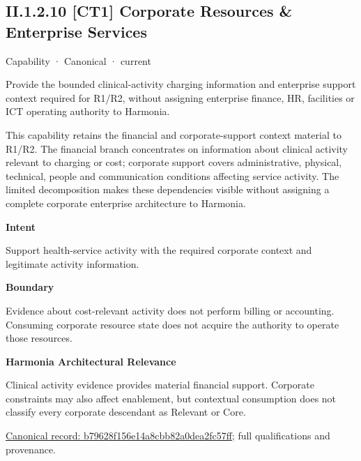 \subsection*{II.1.2.10 [CT1] Corporate Resources \& Enterprise Services}
\label{navigation:II.1.2.10}

\label{element:b79628f156e14a8cbb82a0dea2fc57ff}
{\small Capability · Canonical · current}\par

Provide the bounded clinical-activity charging information and enterprise support context required for R1/R2, without assigning enterprise finance, HR, facilities or ICT operating authority to Harmonia.



This capability retains the financial and corporate-support context material to R1/R2. The financial branch concentrates on information about clinical activity relevant to charging or cost; corporate support covers administrative, physical, technical, people and communication conditions affecting service activity. The limited decomposition makes these dependencies visible without assigning a complete corporate enterprise architecture to Harmonia.



\textbf{Intent}



Support health-service activity with the required corporate context and legitimate activity information.



\textbf{Boundary}



Evidence about cost-relevant activity does not perform billing or accounting. Consuming corporate resource state does not acquire the authority to operate those resources.



\textbf{Harmonia Architectural Relevance}



Clinical activity evidence provides material financial support. Corporate constraints may also affect enablement, but contextual consumption does not classify every corporate descendant as Relevant or Core.


{\footnotesize \href{../../../../continuum/strategy/capability/b79628f156e14a8cbb82a0dea2fc57ff.md}{Canonical record: b79628f156e14a8cbb82a0dea2fc57ff}; full qualifications and provenance.}\par
